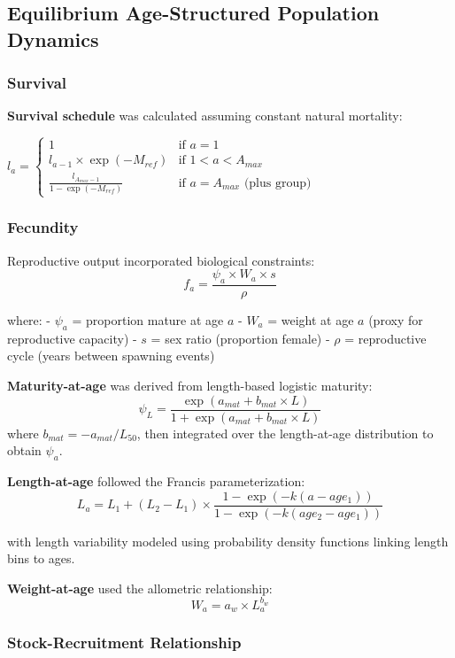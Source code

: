 \documentclass[
  11pt,
]{SCreport}
\begin{document}
\subsection{Equilibrium Age-Structured Population
Dynamics}\label{sec-equilibrium-dynamics}

\subsubsection{Survival}\label{sec-survival}

\textbf{Survival schedule} was calculated assuming constant natural
mortality:

\(l_a = \begin{cases}
1 & \text{if } a = 1 \\
l_{a-1} \times \exp(-M_{ref}) & \text{if } 1 < a < A_{max} \\
\frac{l_{A_{max}-1}}{1-\exp(-M_{ref})} & \text{if } a = A_{max} \text{ (plus group)}
\end{cases}\)

\subsubsection{Fecundity}\label{sec-fecundity-calculation}

Reproductive output incorporated biological constraints:
\[f_a = \frac{\psi_a \times W_a \times s}{\rho}\]

where: - \(\psi_a\) = proportion mature at age \(a\) - \(W_a\) = weight
at age \(a\) (proxy for reproductive capacity) - \(s\) = sex ratio
(proportion female) - \(\rho\) = reproductive cycle (years between
spawning events)

\textbf{Maturity-at-age} was derived from length-based logistic
maturity:
\[\psi_L = \frac{\exp(a_{mat} + b_{mat} \times L)}{1 + \exp(a_{mat} + b_{mat} \times L)}\]
where \(b_{mat} = -a_{mat}/L_{50}\), then integrated over the
length-at-age distribution to obtain \(\psi_a\).

\textbf{Length-at-age} followed the Francis parameterization:
\[L_a = L_1 + (L_2 - L_1) \times \frac{1 - \exp(-k(a - age_1))}{1 - \exp(-k(age_2 - age_1))}\]

with length variability modeled using probability density functions
linking length bins to ages.

\textbf{Weight-at-age} used the allometric relationship:
\[W_a = a_w \times L_a^{b_w}\]

\subsubsection{Stock-Recruitment
Relationship}\label{sec-stock-recruitment}
\end{document}
